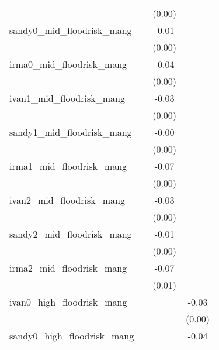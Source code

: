 {\begin{tabular}{l*{3}{c}}
                    &                     &      (0.00)         &                     \\
[1em]
sandy0\_mid\_floodrisk\_mang&                     &       -0.01\sym{*}  &                     \\
                    &                     &      (0.00)         &                     \\
[1em]
irma0\_mid\_floodrisk\_mang&                     &       -0.04\sym{***}&                     \\
                    &                     &      (0.00)         &                     \\
[1em]
ivan1\_mid\_floodrisk\_mang&                     &       -0.03\sym{***}&                     \\
                    &                     &      (0.00)         &                     \\
[1em]
sandy1\_mid\_floodrisk\_mang&                     &       -0.00         &                     \\
                    &                     &      (0.00)         &                     \\
[1em]
irma1\_mid\_floodrisk\_mang&                     &       -0.07\sym{***}&                     \\
                    &                     &      (0.00)         &                     \\
[1em]
ivan2\_mid\_floodrisk\_mang&                     &       -0.03\sym{***}&                     \\
                    &                     &      (0.00)         &                     \\
[1em]
sandy2\_mid\_floodrisk\_mang&                     &       -0.01\sym{***}&                     \\
                    &                     &      (0.00)         &                     \\
[1em]
irma2\_mid\_floodrisk\_mang&                     &       -0.07\sym{***}&                     \\
                    &                     &      (0.01)         &                     \\
[1em]
ivan0\_high\_floodrisk\_mang&                     &                     &       -0.03\sym{***}\\
                    &                     &                     &      (0.00)         \\
[1em]
sandy0\_high\_floodrisk\_mang&                     &                     &       -0.04\sym{***}\\

\end{tabular}}
